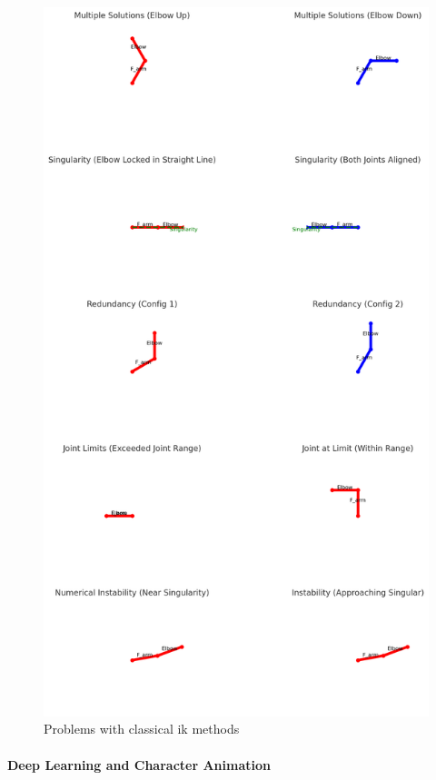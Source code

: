 \documentclass[../../main.tex]{subfiles}
\begin{document}
\begin{figure}
  \centering \includegraphics[width = 5in]{chapters/pose_correction/images/problems_classical.png}
  \caption{Problems with classical \gls{ik} methods}
  \label{fig:problems_classical}
\end{figure}

\paragraph{Deep Learning and Character Animation}
\label{ch:background_work:sign_language_synthesis:3d_techniques:avatar_animation:deep_learning}
\end{document}

